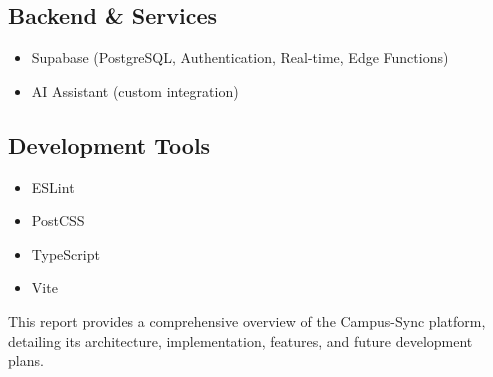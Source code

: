 \subsection{Backend \& Services}
\begin{itemize}
    \item Supabase (PostgreSQL, Authentication, Real-time, Edge Functions)
    \item AI Assistant (custom integration)
\end{itemize}

\subsection{Development Tools}
\begin{itemize}
    \item ESLint
    \item PostCSS
    \item TypeScript
    \item Vite
\end{itemize}

This report provides a comprehensive overview of the Campus-Sync platform, detailing its architecture, implementation, features, and future development plans.